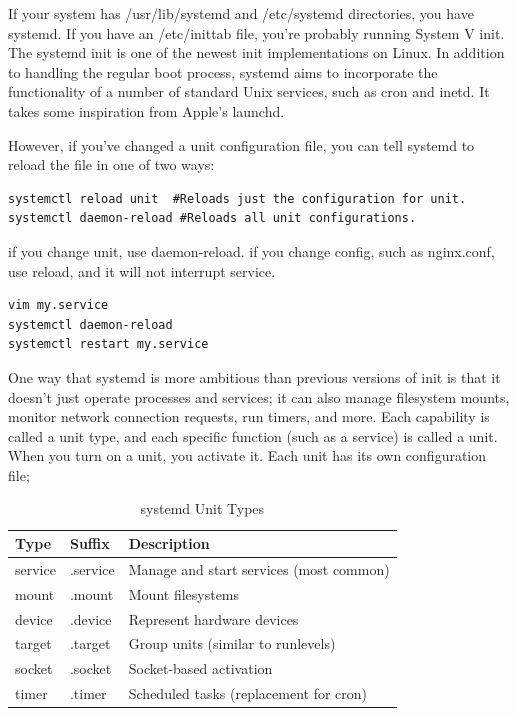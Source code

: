 \documentclass[paper=8.5in:11in, twoside, 12pt, pagesize=pdftex]{book}
\begin{document}
	\par If your system has /usr/lib/systemd and /etc/systemd directories, you have systemd. If you have an /etc/inittab file, you’re probably running System V init. The systemd init is one of the newest init implementations on Linux. In addition to handling the regular boot process, systemd aims to incorporate the functionality of a number of standard Unix services, such as cron and inetd. It takes some inspiration from Apple’s launchd.

	\par However, if you’ve changed a unit configuration file, you can tell systemd to reload the file in one of two ways:
\begin{lstlisting}
systemctl reload unit  #Reloads just the configuration for unit.
systemctl daemon-reload #Reloads all unit configurations.
\end{lstlisting}

	\par if you change unit, use  daemon-reload. if you change config, such as nginx.conf, use reload, and it will not interrupt service.
\begin{lstlisting}
vim my.service
systemctl daemon-reload
systemctl restart my.service
\end{lstlisting}

	\par One way that systemd is more ambitious than previous versions of init is that it doesn’t just operate processes and services; it can also manage filesystem mounts, monitor network connection requests, run timers, and more. Each capability is called a unit type, and each specific function (such as a service) is called a unit. When you turn on a unit, you activate it. Each unit has its own configuration file;

\begin{table}[h]
\centering
\begin{tabular}{|l|l|l|}
\hline
\textbf{Type} & \textbf{Suffix} & \textbf{Description} \\ \hline
service & .service & Manage and start services (most common) \\ \hline
mount & .mount & Mount filesystems \\ \hline
device & .device & Represent hardware devices \\ \hline
target & .target & Group units (similar to runlevels) \\ \hline
socket & .socket & Socket-based activation \\ \hline
timer & .timer & Scheduled tasks (replacement for cron) \\ \hline
\end{tabular}
\caption{systemd Unit Types}
\end{table}
\end{document}
